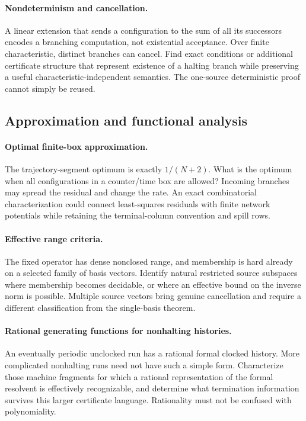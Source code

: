\documentclass[11pt,letterpaper]{article}
\numberwithin{equation}{section}
\theoremstyle{definition}
\begin{document}
\paragraph{Nondeterminism and cancellation.}
A linear extension that sends a configuration to the sum of all its
successors encodes a branching computation, not existential acceptance.
Over finite characteristic, distinct branches can cancel. Find exact
conditions or additional certificate structure that represent
existence of a halting branch while preserving a useful
characteristic-independent semantics. The one-source deterministic
proof cannot simply be reused.

\subsection{Approximation and functional analysis}\label{pwh:bt:q:analysis}
\paragraph{Optimal finite-box approximation.}
The trajectory-segment optimum is exactly $1/(N+2)$. What is the optimum
when all configurations in a counter/time box are allowed? Incoming
branches may spread the residual and change the rate. An exact
combinatorial characterization could connect least-squares residuals
with finite network potentials while retaining the terminal-column
convention and spill rows.

\paragraph{Effective range criteria.}
The fixed operator has dense nonclosed range, and membership is hard
already on a selected family of basis vectors. Identify natural
restricted source subspaces where membership becomes decidable, or
where an effective bound on the inverse norm is possible. Multiple
source vectors bring genuine cancellation and require a different
classification from the single-basis theorem.

\paragraph{Rational generating functions for nonhalting histories.}
An eventually periodic unclocked run has a rational formal clocked
history. More complicated nonhalting runs need not have such a simple
form. Characterize those machine fragments for which a rational
representation of the formal resolvent is effectively recognizable,
and determine what termination information survives this larger
certificate language. Rationality must not be confused with polynomiality.
\end{document}
